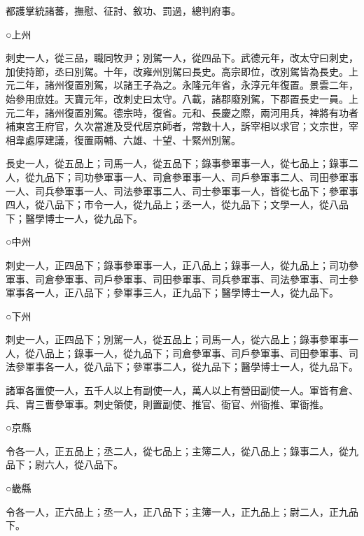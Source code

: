 \begin{pinyinscope}
 都護掌統諸蕃，撫慰、征討、敘功、罰過，總判府事。



 ○上州



 刺史一人，從三品，職同牧尹；別駕一人，從四品下。武德元年，改太守曰刺史，加使持節，丞曰別駕。十年，改雍州別駕曰長史。高宗即位，改別駕皆為長史。上元二年，諸州復置別駕，以諸王子為之。永隆元年省，永淳元年復置。景雲二年，始參用庶姓。天寶元年，改刺史曰太守。八載，諸郡廢別駕，下郡置長史一員。上元二年，諸州復置別駕。德宗時，復省。元和、長慶之際，兩河用兵，裨將有功者補東宮王府官，久次當進及受代居京師者，常數十人，訴宰相以求官；文宗世，宰相韋處厚建議，復置兩輔、六雄、十望、十緊州別駕。



 長史一人，從五品上；司馬一人，從五品下；錄事參軍事一人，從七品上；錄事二人，從九品下；司功參軍事一人、司倉參軍事一人、司戶參軍事二人、司田參軍事一人、司兵參軍事一人、司法參軍事二人、司士參軍事一人，皆從七品下；參軍事四人，從八品下；市令一人，從九品上；丞一人，從九品下；文學一人，從八品下；醫學博士一人，從九品下。



 ○中州



 刺史一人，正四品下；錄事參軍事一人，正八品上；錄事一人，從九品上；司功參軍事、司倉參軍事、司戶參軍事、司田參軍事、司兵參軍事、司法參軍事、司士參軍事各一人，正八品下；參軍事三人，正九品下；醫學博士一人，從九品下。



 ○下州



 刺史一人，正四品下；別駕一人，從五品上；司馬一人，從六品上；錄事參軍事一人，從八品上；錄事一人，從九品下；司倉參軍事、司戶參軍事、司田參軍事、司法參軍事各一人，從八品下；參軍事二人，從九品下；醫學博士一人，從九品下。



 諸軍各置使一人，五千人以上有副使一人，萬人以上有營田副使一人。軍皆有倉、兵、胄三曹參軍事。刺史領使，則置副使、推官、衙官、州衙推、軍衙推。



 ○京縣



 令各一人，正五品上；丞二人，從七品上；主簿二人，從八品上；錄事二人，從九品下；尉六人，從八品下。



 ○畿縣



 令各一人，正六品上；丞一人，正八品下；主簿一人，正九品上；尉二人，正九品下。




\end{pinyinscope}
